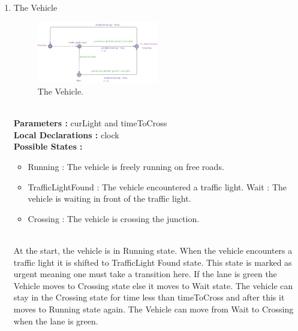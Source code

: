\documentclass[conference]{IEEEtran}
\begin{document}
\begin{enumerate}
    \item The Vehicle 
    \begin{figure}[H]
        \centering
        \includegraphics[width=0.5\textwidth]{Fig 2.png}
    \caption{The Vehicle.}
    \end{figure}
    \\
    \textbf{Parameters :} curLight and timeToCross
    \\
    \textbf{Local Declarations :} clock
    \\
    \textbf{Possible States :}
    \begin{itemize}
        \item Running : The vehicle is freely running on free roads.
        \item TrafficLightFound : The vehicle encountered a traffic light.
        \itme Wait : The vehicle is waiting in front of the traffic light.
        \item Crossing : The vehicle is crossing the junction.
    \end{itemize}
    \\
    At the start, the vehicle is in Running state. When the vehicle encounters a traffic light it is shifted to TrafficLight Found state. This state is marked as urgent meaning one must take a transition here. If the lane is green the Vehicle moves to Crossing state else it moves to Wait state. The vehicle can stay in the Crossing state for time less than timeToCross and after this it moves to Running state again. The Vehicle can move from Wait to Crossing when the lane is green.
    \\
    

\end{enumerate}
\end{document}
